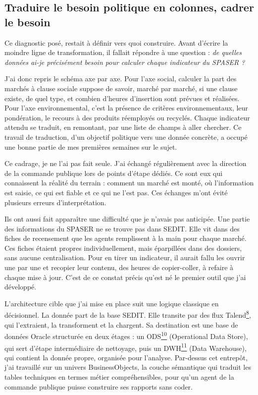 \documentclass[11pt,a4paper]{article}
\newcommand{\lexref}[1]{\hyperlink{lex:#1}{\textsuperscript{#1}}}
\begin{document}
\subsection{Traduire le besoin politique en colonnes, cadrer le besoin}
Ce diagnostic posé, restait à définir vers quoi construire. Avant d'écrire la moindre ligne de transformation, il fallait répondre à une question : \emph{de quelles données ai-je précisément besoin pour calculer chaque indicateur du SPASER ?}

J'ai donc repris le schéma axe par axe. Pour l'axe social, calculer la part des marchés à clause sociale suppose de savoir, marché par marché, si une clause existe, de quel type, et combien d'heures d'insertion sont prévues et réalisées. Pour l'axe environnemental, c'est la présence de critères environnementaux, leur pondération, le recours à des produits réemployés ou recyclés. Chaque indicateur attendu se traduit, en remontant, par une liste de champs à aller chercher. Ce travail de traduction, d'un objectif politique vers une donnée concrète, a occupé une bonne partie de mes premières semaines sur le sujet.

Ce cadrage, je ne l'ai pas fait seule. J'ai échangé régulièrement avec la direction de la commande publique lors de points d'étape dédiés. Ce sont eux qui connaissent la réalité du terrain : comment un marché est monté, où l'information est saisie, ce qui est fiable et ce qui ne l'est pas. Ces échanges m'ont évité plusieurs erreurs d'interprétation.

Ils ont aussi fait apparaître une difficulté que je n'avais pas anticipée. Une partie des informations du SPASER ne se trouve pas dans SEDIT. Elle vit dans des fiches de recensement que les agents remplissent à la main pour chaque marché. Ces fiches étaient propres individuellement, mais éparpillées dans des dossiers, sans aucune centralisation. Pour en tirer un indicateur, il aurait fallu les ouvrir une par une et recopier leur contenu, des heures de copier-coller, à refaire à chaque mise à jour. C'est de ce constat précis qu'est né le premier outil que j'ai développé.

L'architecture cible que j'ai mise en place suit une logique classique en décisionnel. La donnée part de la base SEDIT. Elle transite par des flux Talend\lexref{8}, qui l'extraient, la transforment et la chargent. Sa destination est une base de données Oracle structurée en deux étages : un ODS\lexref{10} (Operational Data Store), qui sert d'étape intermédiaire de nettoyage, puis un DWH\lexref{11} (Data Warehouse), qui contient la donnée propre, organisée pour l'analyse. Par-dessus cet entrepôt, j'ai travaillé sur un univers BusinessObjects, la couche sémantique qui traduit les tables techniques en termes métier compréhensibles, pour qu'un agent de la commande publique puisse construire ses rapports sans coder.
\end{document}
